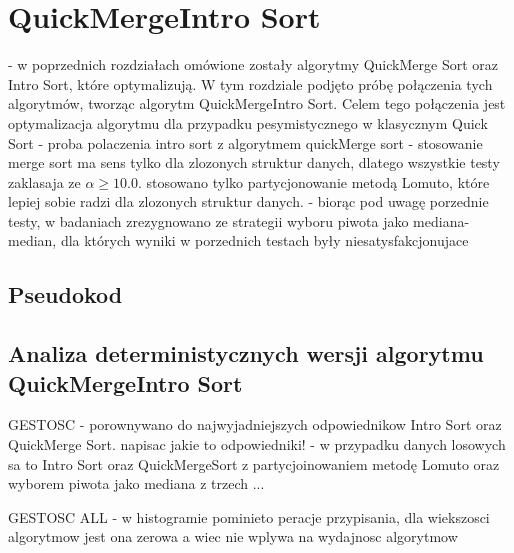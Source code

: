 \newpage
\section{QuickMergeIntro Sort}
- w poprzednich rozdziałach omówione zostały algorytmy QuickMerge Sort oraz Intro Sort, które optymalizują.
W tym rozdziale podjęto próbę połączenia tych algorytmów, tworząc algorytm QuickMergeIntro Sort. Celem tego połączenia jest optymalizacja algorytmu dla przypadku pesymistycznego w klasycznym Quick Sort
- proba polaczenia intro sort z algorytmem quickMerge sort
- stosowanie merge sort ma sens tylko dla zlozonych struktur danych, dlatego wszystkie testy zaklasaja ze $\alpha \geq 10.0$. stosowano tylko partycjonowanie metodą Lomuto, które lepiej sobie radzi dla zlozonych struktur danych.
- biorąc pod uwagę porzednie testy, w badaniach zrezygnowano ze strategii wyboru piwota jako mediana-median, dla których wyniki w porzednich testach były niesatysfakcjonujace

\subsection{Pseudokod}



\subsection{Analiza deterministycznych wersji algorytmu QuickMergeIntro Sort}

GESTOSC
- porownywano do najwyjadniejszych odpowiednikow Intro Sort oraz QuickMerge Sort. napisac jakie to odpowiedniki!
- w przypadku danych losowych sa to Intro Sort oraz QuickMergeSort z partycjoinowaniem metodę Lomuto oraz wyborem piwota jako mediana z trzech ...

GESTOSC ALL
- w histogramie pominieto peracje przypisania, dla wiekszosci algorytmow jest ona zerowa a wiec nie wplywa na wydajnosc algorytmow

\begin{figure}[]
	\centering
	
	\caption[]{}
	\label{fig:quick-merge-intro-sort-deterministic-pivot-density}
\end{figure}

\begin{figure}[]
	\centering
	
	\caption[]{}
	\label{fig:quick-merge-intro-sort-deterministic-pivot-density-sorted}
\end{figure}

